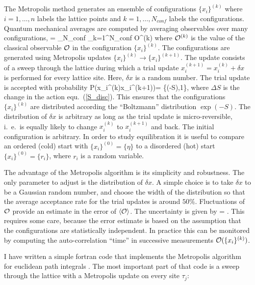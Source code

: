  The Metropolis method generates an ensemble of configurations
$\{x_i\}^{(k)}$ where $i=1,\ldots, n$ labels the lattice points and $k=
1,\ldots,N_{conf}$ labels the configurations. Quantum mechanical averages 
are computed by averaging observables over many configurations, 
\be 
{} \rangle = \lim_{N_{conf}\to\infty}
 \sum_{k=1}^{N_{conf}}
 {\cal O}^{(k)}
\ee
where ${\cal O}^{(k)}$ is the value of the classical observable
${\cal O}$ in the configuration $\{x_i\}^{(k)}$. The configurations 
are generated using Metropolis updates $\{x_i\}^{(k)}\to \{x_i\}^{(k+1)}$. 
The update consists of a sweep through the lattice during which a trial 
update $x_i^{(k+1)}= x_i^{(k)} +\delta x$ is performed for every lattice 
site. Here, $\delta x$ is a random number. The trial update is accepted 
with probability
\be
 P\left(x_i^{(k)}\to x_i^{(k+1)}\right)=
   \min\left\{\exp(-\Delta S),1\right\},
\ee 
where $\Delta S$ is the change in the action equ.~(\ref{S_disc}). 
This ensures that the configurations $\{x_i\}^{(k)}$ are distributed 
according the ``Boltzmann'' distribution $\exp(-S)$. The distribution 
of $\delta x$ is arbitrary as long as the trial update is micro-reversible, 
i.~e.~is equally likely to change $x_i^{(k)}$ to $x_i^{(k+1)}$ and back. 
The initial configuration is arbitrary. In order to study equilibration 
it is useful to compare an ordered (cold) start with $\{x_i\}^{(0)}=
\{\eta\}$ to a disordered (hot) start $\{x_i\}^{(0)}=\{r_i\}$, where 
$r_i$ is a random variable. 

 The advantage of the Metropolis algorithm is its simplicity and robustness. 
The only parameter to adjust is the distribution of $\delta x$. A simple
choice is to take $\delta x$ to be a Gaussian random number, and choose the
width of the distribution so that the average acceptance rate for the trial 
updates is around $50\%$. Fluctuations of ${\cal O}$ provide an estimate 
in the error of $\langle {\cal O}\rangle$. The uncertainty is given by 
\be 
\Delta {} \rangle =
 . 
\ee
This requires some care, because the error estimate is based on 
the assumption that the configurations are statistically independent. 
In practice this can be monitored by computing the auto-correlation 
``time'' in successive measurements ${\cal O}(\{x_i\}^{(k)})$. 

 I have written a simple fortran code that implements the Metropolis 
algorithm for euclidean path integrals \cite{Schafer:2004xa}. The 
most important part of that code is a sweep through the lattice 
with a Metropolis update on every site $\tau_j$: 

